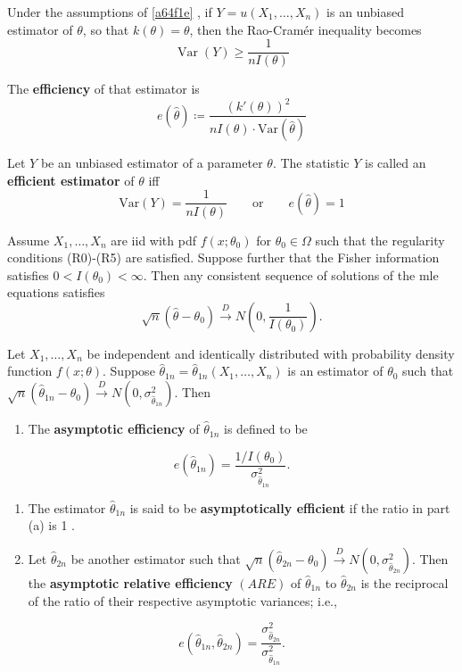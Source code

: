 \begin{corollary}
Under the assumptions of \cref{a64f1e} , if $Y=u(X_1, \ldots, X_n)$ is an unbiased estimator of $\theta$, so that $k(\theta)=\theta$, then the Rao-Cramér inequality becomes
\begin{equation}
\operatorname{Var}(Y) \geq \frac{1}{n I(\theta)}
\label{08320e}
\end{equation}
\end{corollary}

\begin{definition}[Efficiency]
The \textbf{efficiency} of that estimator is
\[
e(\widehat{\theta})\coloneqq \frac{(k'(\theta))^2}{nI(\theta)\cdot \mathrm{Var}(\widehat{\theta})}
\]
\end{definition}
\begin{definition}
Let $Y$ be an unbiased estimator of a parameter $\theta$. The statistic $Y$ is called an \textbf{efficient estimator} of $\theta$ iff
\[
\mathrm{Var}(Y)=\frac{1}{nI(\theta)}\qquad \text{or}\qquad e(\widehat{\theta})=1
\]
\end{definition}
\begin{theorem}
Assume $X_1, \ldots, X_n$ are iid with pdf $f\left(x ; \theta_0\right)$ for $\theta_0 \in \Omega$ such that the regularity conditions (R0)-(R5) are satisfied. Suppose further that the Fisher information satisfies $0<I\left(\theta_0\right)<\infty$. Then any consistent sequence of solutions of the mle equations satisfies
\[
\sqrt{n}\left(\widehat{\theta}-\theta_0\right) \xrightarrow{D} N\left(0, \frac{1}{I\left(\theta_0\right)}\right) .
\]
\end{theorem}
\begin{definition}
Let $X_1, \ldots, X_n$ be independent and identically distributed with probability density function $f(x ; \theta)$. Suppose $\widehat{\theta}_{1 n}=\widehat{\theta}_{1 n}\left(X_1, \ldots, X_n\right)$ is an estimator of $\theta_0$ such that $\sqrt{n}\left(\widehat{\theta}_{1 n}-\theta_0\right) \xrightarrow{D} N\left(0, \sigma_{\widehat{\theta}_{1 n}}^2\right)$. Then
	\begin{enumerate}
		\item The \textbf{asymptotic efficiency} of $\widehat{\theta}_{1 n}$ is defined to be
	\end{enumerate}
\[
e\left(\widehat{\theta}_{1 n}\right)=\frac{1 / I\left(\theta_0\right)}{\sigma_{\widehat{\theta}_{1 n}}^2} .
\]	\begin{enumerate}
		\item The estimator $\widehat{\theta}_{1 n}$ is said to be \textbf{asymptotically efficient} if the ratio in part (a) is 1 .
		\item Let $\widehat{\theta}_{2 n}$ be another estimator such that $\sqrt{n}\left(\widehat{\theta}_{2 n}-\theta_0\right) \xrightarrow{D} N\left(0, \sigma_{\widehat{\theta}_{2 n}}^2\right)$. Then the \textbf{asymptotic relative efficiency} $(A R E)$ of $\widehat{\theta}_{1 n}$ to $\widehat{\theta}_{2 n}$ is the reciprocal of the ratio of their respective asymptotic variances; i.e.,
	\end{enumerate}
\[
e\left(\widehat{\theta}_{1 n}, \widehat{\theta}_{2 n}\right)=\frac{\sigma_{\widehat{\theta}_{2 n}}^2}{\sigma_{\widehat{\theta}_{1 n}}^2} .
\]
\end{definition}
